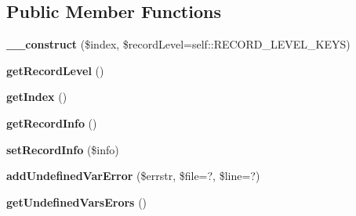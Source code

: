 \subsection*{Public Member Functions}
\begin{DoxyCompactItemize}
\item 
\mbox{\label{class_pes_1_1_view_1_1_recorder_1_1_variables_usage_recorder_af729caa491bc89a4abdbb8ab3bd04ba1}} 
{\bfseries \+\_\+\+\_\+construct} (\$index, \$record\+Level=self\+::\+R\+E\+C\+O\+R\+D\+\_\+\+L\+E\+V\+E\+L\+\_\+\+K\+E\+YS)
\item 
\mbox{\label{class_pes_1_1_view_1_1_recorder_1_1_variables_usage_recorder_a4f0c1bda6f641e29b7de4a095b0413e5}} 
{\bfseries get\+Record\+Level} ()
\item 
\mbox{\label{class_pes_1_1_view_1_1_recorder_1_1_variables_usage_recorder_a09e05874cec9afe26d34d8d5835fa870}} 
{\bfseries get\+Index} ()
\item 
\mbox{\label{class_pes_1_1_view_1_1_recorder_1_1_variables_usage_recorder_a621aba28181e48c2b6be01e84da299a3}} 
{\bfseries get\+Record\+Info} ()
\item 
\mbox{\label{class_pes_1_1_view_1_1_recorder_1_1_variables_usage_recorder_abb388a7ed12b1f58b2e98def6a4f44c2}} 
{\bfseries set\+Record\+Info} (\$info)
\item 
\mbox{\label{class_pes_1_1_view_1_1_recorder_1_1_variables_usage_recorder_ab205fc7e87c5d77a90a2ff448a3292fa}} 
{\bfseries add\+Undefined\+Var\+Error} (\$errstr, \$file=\textquotesingle{}?\textquotesingle{}, \$line=\textquotesingle{}?\textquotesingle{})
\item 
\mbox{\label{class_pes_1_1_view_1_1_recorder_1_1_variables_usage_recorder_ac2f5fd3794dd6aaf619cc5295fdde79c}} 
{\bfseries get\+Undefined\+Vars\+Erors} ()
\item 

\end{DoxyCompactItemize}

